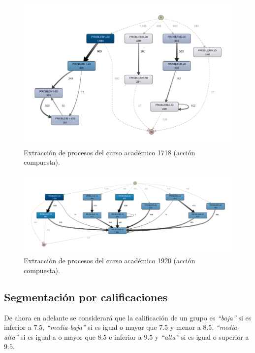 \begin{figure}[H]
    \centering
    \includegraphics[width=1.25\textwidth]{imagenes/DISCO_compound/Year1718.png}
    \caption{Extracción de procesos del curso académico 1718 (acción compuesta).}
    \label{fig:año1718}
\end{figure}

\begin{figure}[H]
    \centering
    \includegraphics[width=1.25\textwidth]{imagenes/DISCO_compound/Year1920.png}
    \caption{Extracción de procesos del curso académico 1920 (acción compuesta).}
    \label{fig:año1920}
\end{figure}

\subsection{Segmentación por calificaciones}

De ahora en adelante se considerará que la calificación de un grupo es \emph{``baja''} si es inferior a $7.5$, \emph{``media-baja''} si es igual o mayor que $7.5$ y menor a $8.5$, \emph{``media-alta''} si es igual a o mayor que $8.5$ e inferior a $9.5$ y \emph{``alta''} si es igual o superior a $9.5$.

